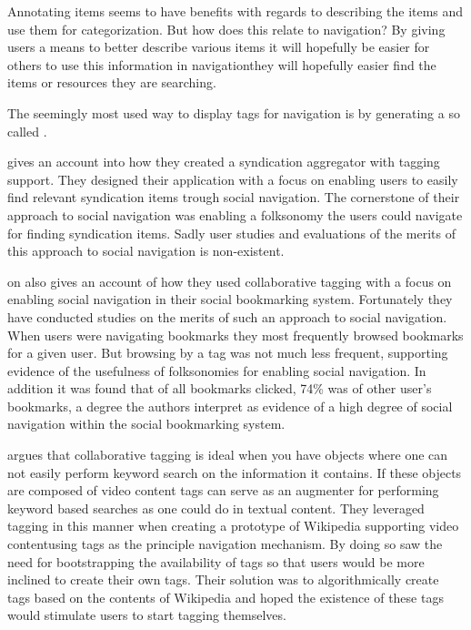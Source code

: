Annotating items seems to have benefits with regards to describing the items
and use them for categorization. But how does this relate to navigation?
By giving users a means to better describe various items it will hopefully be
easier for others to use this information in navigation\dash{}they will
hopefully easier find the items or resources they are searching.

The seemingly most used way to display tags for navigation is by generating
a so called %
.


\citet{jarrett05} gives an account into how they created a syndication
aggregator with tagging support. They designed their application with a focus
on enabling users to easily find relevant syndication items trough
social navigation. The cornerstone of their approach to social navigation was
enabling a folksonomy the users could navigate for finding syndication
items. Sadly user studies and evaluations
of the merits of this approach to social navigation is non-existent.

\citet{millen06} on also gives an account of how they used collaborative
tagging with a focus on enabling social navigation in their
 social bookmarking system. Fortunately they have conducted
studies on the merits of such an approach to social navigation. When users
were navigating bookmarks they most frequently browsed bookmarks for a given
user. But browsing by a tag was not much less frequent, supporting evidence of
the usefulness of folksonomies for enabling social navigation. In addition
it was found that of all bookmarks clicked, 74\% was of other user's
bookmarks, a degree the authors interpret as evidence of a high degree of
social navigation within the social bookmarking system.

\citet[]{fokker06} argues that collaborative tagging is ideal
when you have objects where one can not easily perform keyword search on the
information it contains. If these objects are composed of video content tags
can serve as an augmenter for performing keyword based searches as one could
do in textual content. They leveraged tagging in this manner when creating a
prototype of Wikipedia supporting video content\dash{}using tags as the
principle navigation mechanism. By doing so \citet[]{fokker06}
saw the need for bootstrapping the availability of tags so that users would be
more inclined to create their own tags. Their solution was to algorithmically
create tags based on the contents of Wikipedia and hoped the existence of
these tags would stimulate users to start tagging themselves.

